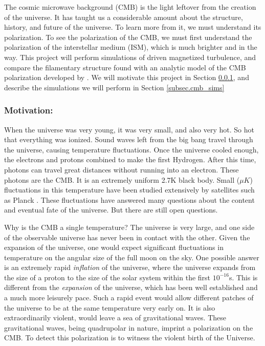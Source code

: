 The cosmic microwave background (CMB) is the light leftover from the creation of
the universe.  It has taught us a considerable amount about the structure,
history, and future of the
universe.  To learn more from it, we must understand its polarization.  To see
the polarization of the CMB, we must first understand the polarization of the
interstellar medium (ISM), which is much brighter and in the way.  This project
will perform simulations of driven magnetized turbulence, and compare the
filamentary structure found with an analytic model of the CMB polarization
developed by \citet{Huffenberger20}.  We will
motivate this project in Section \ref{subsec.cmb_motivate}, and describe the
simulations we will perform in Section \ref{subsec.cmb_sims}

\subsubsection{Motivation: \nameCMB}
\label{subsec.cmb_motivate}

When the universe was very young, it was very small, and also very hot.  So hot
that everything was ionized.  Sound waves left from the big bang travel through
the universe, causing temperature fluctuations.  Once the universe cooled
enough, the electrons and protons combined to make the first Hydrogen.  After
this time, photons can travel great distances without running into an electron.
These photons are the CMB.  It is an extremely uniform 2.7K black body.  Small
($\mu K$) fluctuations in this temperature have been studied extensively by
satellites such as Planck \citep{Planck2018VI20}. These fluctuations have answered many
questions about the content and eventual fate of the universe.  But there are
still open questions.

Why is the CMB a single temperature?  The
universe is very large, and one side of the observable universe has never been
in contact with the other.  Given the expansion of the universe, one would
expect significant fluctuations in temperature on the angular size of the full moon on the sky.
One possible answer is an extremely rapid
\emph{inflation} of the universe, where the universe expands from the size of a
proton to the size of the solar system within the first $10^{-16}$s.  This is
different from the \emph{expansion} of the universe, which has been well
established and a much more leisurely pace.  Such a
rapid event would allow different patches of the universe to be at the same
temperature very early on.  
It is also extraordinarily violent, would leave a sea of gravitational waves.  These gravitational
waves, being quadrupolar in nature, imprint a polarization on the CMB. To detect
this polarization is to witness the violent birth of the Universe.

